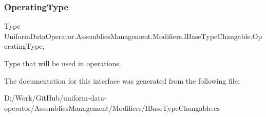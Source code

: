 \subsubsection{\texorpdfstring{Operating\+Type}{OperatingType}}
{\footnotesize\ttfamily Type Uniform\+Data\+Operator.\+Assemblies\+Management.\+Modifiers.\+I\+Base\+Type\+Changable.\+Operating\+Type\hspace{0.3cm}{\ttfamily [get]}, {\ttfamily [set]}}



Type that will be used in operations. 



The documentation for this interface was generated from the following file\+:\begin{DoxyCompactItemize}
\item 
D\+:/\+Work/\+Git\+Hub/uniform-\/data-\/operator/\+Assemblies\+Management/\+Modifiers/I\+Base\+Type\+Changable.\+cs\end{DoxyCompactItemize}
